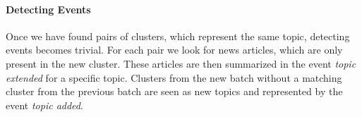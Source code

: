 \paragraph{Detecting Events}
Once we have found pairs of clusters, which represent the same topic, detecting events becomes trivial.
For each pair we look for news articles, which are only present in the new cluster.
These articles are then summarized in the event \textit{topic extended} for a specific topic.
Clusters from the new batch without a matching cluster from the previous batch
are seen as new topics and represented by the event \textit{topic added}.

